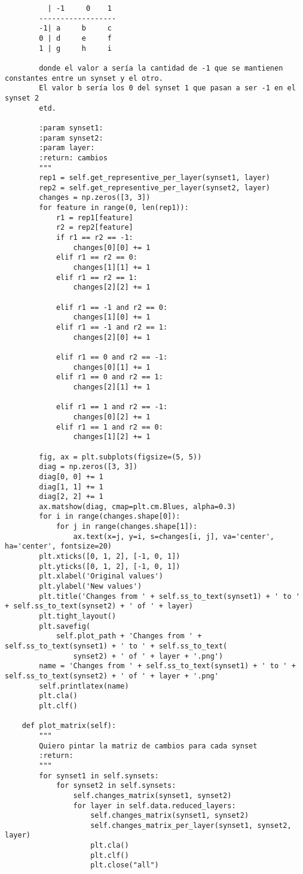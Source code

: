 \documentclass[12,twoside]{TFG-GM}
\theoremstyle{definition}
\theoremstyle{remark}
\begin{document}
\begin{verbatim}
          | -1     0    1
        ------------------
        -1| a     b     c
        0 | d     e     f
        1 | g     h     i

        donde el valor a sería la cantidad de -1 que se mantienen constantes entre un synset y el otro.
        El valor b sería los 0 del synset 1 que pasan a ser -1 en el synset 2
        etd.

        :param synset1:
        :param synset2:
        :param layer:
        :return: cambios
        """
        rep1 = self.get_representive_per_layer(synset1, layer)
        rep2 = self.get_representive_per_layer(synset2, layer)
        changes = np.zeros([3, 3])
        for feature in range(0, len(rep1)):
            r1 = rep1[feature]
            r2 = rep2[feature]
            if r1 == r2 == -1:
                changes[0][0] += 1
            elif r1 == r2 == 0:
                changes[1][1] += 1
            elif r1 == r2 == 1:
                changes[2][2] += 1

            elif r1 == -1 and r2 == 0:
                changes[1][0] += 1
            elif r1 == -1 and r2 == 1:
                changes[2][0] += 1

            elif r1 == 0 and r2 == -1:
                changes[0][1] += 1
            elif r1 == 0 and r2 == 1:
                changes[2][1] += 1

            elif r1 == 1 and r2 == -1:
                changes[0][2] += 1
            elif r1 == 1 and r2 == 0:
                changes[1][2] += 1

        fig, ax = plt.subplots(figsize=(5, 5))
        diag = np.zeros([3, 3])
        diag[0, 0] += 1
        diag[1, 1] += 1
        diag[2, 2] += 1
        ax.matshow(diag, cmap=plt.cm.Blues, alpha=0.3)
        for i in range(changes.shape[0]):
            for j in range(changes.shape[1]):
                ax.text(x=j, y=i, s=changes[i, j], va='center', ha='center', fontsize=20)
        plt.xticks([0, 1, 2], [-1, 0, 1])
        plt.yticks([0, 1, 2], [-1, 0, 1])
        plt.xlabel('Original values')
        plt.ylabel('New values')
        plt.title('Changes from ' + self.ss_to_text(synset1) + ' to ' + self.ss_to_text(synset2) + ' of ' + layer)
        plt.tight_layout()
        plt.savefig(
            self.plot_path + 'Changes from ' + self.ss_to_text(synset1) + ' to ' + self.ss_to_text(
                synset2) + ' of ' + layer + '.png')
        name = 'Changes from ' + self.ss_to_text(synset1) + ' to ' + self.ss_to_text(synset2) + ' of ' + layer + '.png'
        self.printlatex(name)
        plt.cla()
        plt.clf()

    def plot_matrix(self):
        """
        Quiero pintar la matriz de cambios para cada synset
        :return:
        """
        for synset1 in self.synsets:
            for synset2 in self.synsets:
                self.changes_matrix(synset1, synset2)
                for layer in self.data.reduced_layers:
                    self.changes_matrix(synset1, synset2)
                    self.changes_matrix_per_layer(synset1, synset2, layer)
                    plt.cla()
                    plt.clf()
                    plt.close("all")

\end{verbatim}
\end{document}
